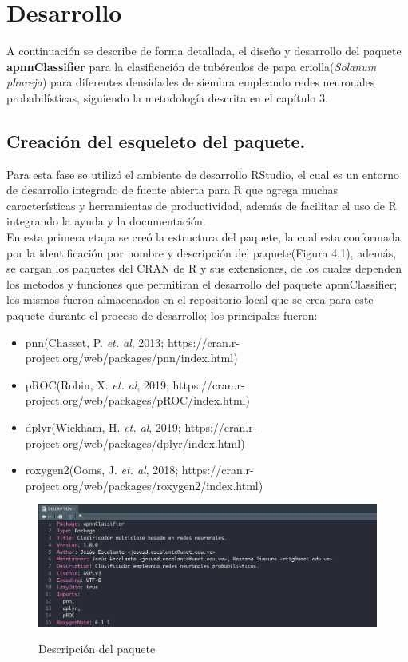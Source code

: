 \chapter{Desarrollo}

	A continuaci\'on se describe de forma detallada, el diseño y desarrollo del paquete \textbf{apnnClassifier} para la clasificaci\'on de tub\'erculos de papa criolla(\textit{Solanum phureja}) para diferentes densidades de siembra empleando redes neuronales probabil\'isticas, siguiendo la metodolog\'ia descrita en el cap\'itulo 3.
	
\section{Creación del esqueleto del paquete.}
	
	Para esta fase se utilizó el ambiente de desarrollo RStudio, el cual es un entorno de desarrollo integrado de fuente abierta para R que agrega muchas caracter\'isticas y herramientas de productividad, además de facilitar el uso de R integrando la ayuda y la documentación.\\
En esta primera etapa se creó la estructura del paquete, la cual esta conformada por la identificación por nombre y descripción del paquete(Figura 4.1), además, se cargan los paquetes del CRAN de R y sus extensiones, de los cuales dependen los metodos y funciones que permitiran el desarrollo del paquete apnnClassifier; los mismos fueron almacenados en el repositorio local que se crea para este paquete durante el proceso de desarrollo; los principales fueron:\\

\begin{itemize}
\item pnn(Chasset, P. \textit{et. al}, 2013; https://cran.r-project.org/web/packages/pnn/index.html)
\item pROC(Robin, X. \textit{et. al}, 2019; https://cran.r-project.org/web/packages/pROC/index.html)
\item dplyr(Wickham, H. \textit{et. al}, 2019; https://cran.r-project.org/web/packages/dplyr/index.html)
\item roxygen2(Ooms, J. \textit{et. al}, 2018; https://cran.r-project.org/web/packages/roxygen2/index.html)
\end{itemize}

\begin{figure}[h]
	\caption{Descripción del paquete}
	\centering
	\includegraphics[scale=0.5]{package-description.png}
	\label{fig:arch}
\end{figure}

	